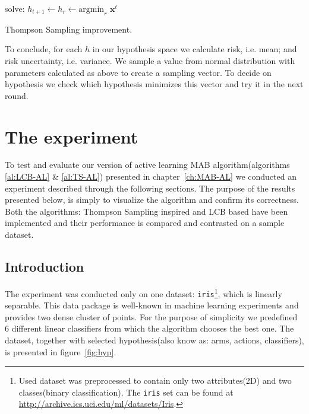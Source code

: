 \documentclass[12pt, a4paper, pdflatex, leqno, twoside]{report}
\begin{document}
\vspace{2cm}
\begin{algorithm}[H]
  solve: $h_{t+1} \leftarrow h_r \leftarrow \text{argmin}_{r} \text{~} 
\mathbf{x}^t$\;
 \caption{Thompson Sampling improvement.\label{al:TS-AL}}
\end{algorithm}
\vspace{2cm}

To conclude, for each $h$ in our hypothesis space we calculate risk, i.e. mean; and 
risk uncertainty, i.e. variance. We sample a value from normal distribution with 
parameters calculated as above to create a sampling vector. To decide on 
hypothesis we check which hypothesis minimizes this vector and try it in the next round.\\






\chapter{The experiment}
To test and evaluate our version of active learning MAB algorithm(algorithms \ref{al:LCB-AL} \& \ref{al:TS-AL}) presented in chapter~\ref{ch:MAB-AL} we conducted an 
experiment described through the following sections. The purpose of the results 
presented below, is simply to visualize the algorithm and confirm its correctness. 
Both the algorithms: Thompson Sampling inspired and LCB based have been implemented and their performance is compared and contrasted on a sample dataset. \\

\section{Introduction}
The experiment was conducted only on one dataset: \texttt{iris}\footnote{Used 
dataset was preprocessed to contain only two attributes(2D) and two 
classes(binary classification). The \texttt{iris} set can be found at 
\url{http://archive.ics.uci.edu/ml/datasets/Iris}.}, which is linearly 
separable. This data package is well-known in machine learning experiments and 
provides two dense cluster of points. For the purpose of simplicity we 
predefined 6 different linear classifiers from which the algorithm chooses the 
best one. The dataset, together with selected hypothesis(also know as: arms, actions, classifiers), is presented in 
figure~\ref{fig:hyp}.\\
\end{document}
